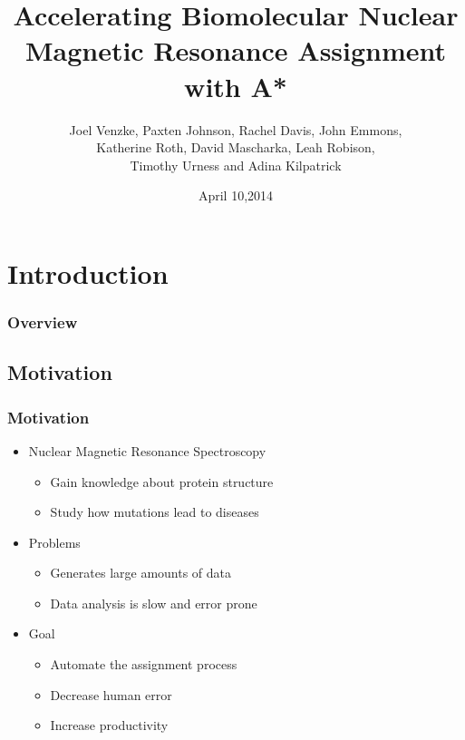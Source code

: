 \documentclass{beamer}
\title[NMR Assignment with A*]{Accelerating Biomolecular Nuclear Magnetic Resonance Assignment with A*} %
\author[J. Venzke, P. Johnson, R. Davis, J. Emmons, K. Roth, D. Mascharka, L. Robison, T. Urness, A. Kilpatrick]{Joel Venzke, Paxten Johnson, Rachel Davis, John Emmons,\\ Katherine Roth, David Mascharka, Leah Robison,\\ Timothy Urness and Adina Kilpatrick} %
\institute[Drake University] %
{
Department of Mathematics and Computer Science\\
Drake University\\

\medskip
\textit{joel.venzke@drake.edu} %
}
\date{April 10,2014} %
\begin{document}
\begin{frame}
\titlepage %
\end{frame}

\section{Introduction}
\begin{frame}
\frametitle{Overview} %
\tableofcontents 
\end{frame}

\subsection{Motivation} 
\begin{frame}
	\frametitle{Motivation}
	\begin{itemize}
		\item Nuclear Magnetic Resonance Spectroscopy
		\begin{itemize}
			\item Gain knowledge about protein structure
			\item Study how mutations lead to diseases
		\end{itemize}
		\item Problems
		\begin{itemize}
			\item Generates large amounts of data
			\item Data analysis is slow and error prone 
		\end{itemize}
		\item Goal
		\begin{itemize}
			\item Automate the assignment process
			\item Decrease human error
			\item Increase productivity
		\end{itemize}
	\end{itemize}
\end{frame}

\end{document}
